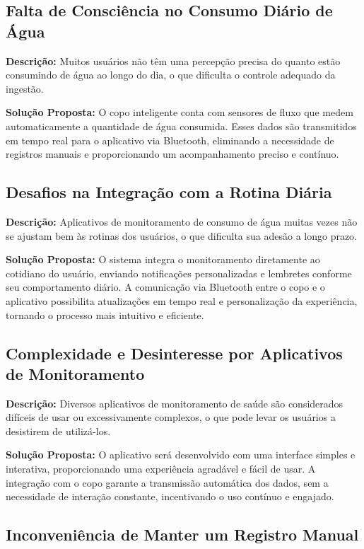\documentclass[12pt]{article}
\begin{document}
\subsection{Falta de Consciência no Consumo Diário de Água}

\textbf{Descrição:}  
Muitos usuários não têm uma percepção precisa do quanto estão consumindo de água ao longo do dia, o que dificulta o controle adequado da ingestão.

\textbf{Solução Proposta:}  
O copo inteligente conta com sensores de fluxo que medem automaticamente a quantidade de água consumida. Esses dados são transmitidos em tempo real para o aplicativo via Bluetooth, eliminando a necessidade de registros manuais e proporcionando um acompanhamento preciso e contínuo.

\subsection{Desafios na Integração com a Rotina Diária}

\textbf{Descrição:}  
Aplicativos de monitoramento de consumo de água muitas vezes não se ajustam bem às rotinas dos usuários, o que dificulta sua adesão a longo prazo.

\textbf{Solução Proposta:}  
O sistema integra o monitoramento diretamente ao cotidiano do usuário, enviando notificações personalizadas e lembretes conforme seu comportamento diário. A comunicação via Bluetooth entre o copo e o aplicativo possibilita atualizações em tempo real e personalização da experiência, tornando o processo mais intuitivo e eficiente.

\subsection{Complexidade e Desinteresse por Aplicativos de Monitoramento}

\textbf{Descrição:}  
Diversos aplicativos de monitoramento de saúde são considerados difíceis de usar ou excessivamente complexos, o que pode levar os usuários a desistirem de utilizá-los.

\textbf{Solução Proposta:}  
O aplicativo será desenvolvido com uma interface simples e interativa, proporcionando uma experiência agradável e fácil de usar. A integração com o copo garante a transmissão automática dos dados, sem a necessidade de interação constante, incentivando o uso contínuo e engajado.

\subsection{Inconveniência de Manter um Registro Manual}
\end{document}
